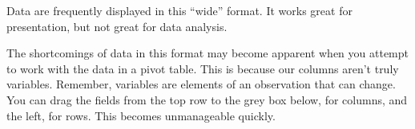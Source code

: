 \documentclass[]{book}
\newenvironment{Shaded}{\begin{snugshade}}{\end{snugshade}}
\newcommand{\CommentTok}[1]{\textcolor[rgb]{0.56,0.35,0.01}{\textit{#1}}}
\newcommand{\DataTypeTok}[1]{\textcolor[rgb]{0.13,0.29,0.53}{#1}}
\newcommand{\DecValTok}[1]{\textcolor[rgb]{0.00,0.00,0.81}{#1}}
\newcommand{\KeywordTok}[1]{\textcolor[rgb]{0.13,0.29,0.53}{\textbf{#1}}}
\newcommand{\NormalTok}[1]{#1}
\newcommand{\OperatorTok}[1]{\textcolor[rgb]{0.81,0.36,0.00}{\textbf{#1}}}
\newcommand{\OtherTok}[1]{\textcolor[rgb]{0.56,0.35,0.01}{#1}}
\newcommand{\StringTok}[1]{\textcolor[rgb]{0.31,0.60,0.02}{#1}}
\begin{document}
\begin{Shaded}
\end{Shaded}

\hypertarget{htmlwidget-8e654a4cc5f689b1b6f4}{}

Data are frequently displayed in this ``wide'' format. It works great for presentation, but not great for data analysis.

The shortcomings of data in this format may become apparent when you attempt to work with the data in a pivot table. This is because our columns aren't truly variables. Remember, variables are elements of an observation that can change. You can drag the fields from the top row to the grey box below, for columns, and the left, for rows. This becomes unmanageable quickly.

\begin{Shaded}
\end{Shaded}
\end{document}
